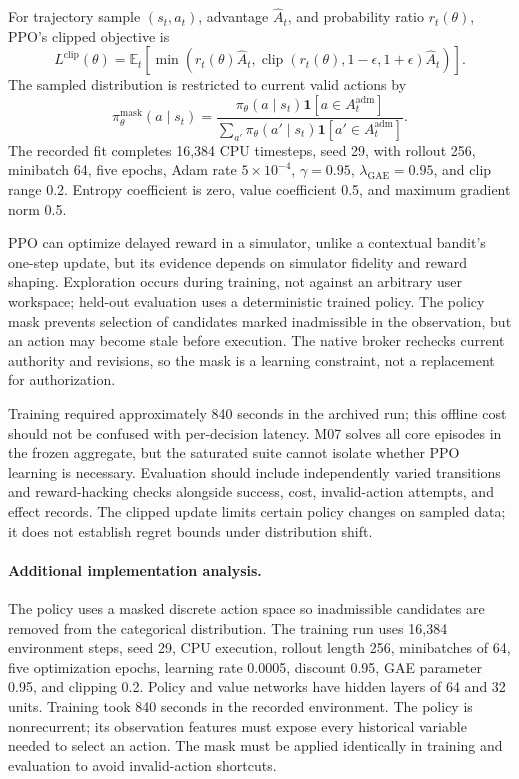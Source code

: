 For trajectory sample $(s_t,a_t)$, advantage $\hat A_t$, and probability ratio $r_t(\theta)$, PPO's clipped objective is
\begin{equation}
L^{\mathrm{clip}}(\theta)=\mathbb E_t\left[\min\left(r_t(\theta)\hat A_t,
\operatorname{clip}(r_t(\theta),1-\epsilon,1+\epsilon)\hat A_t\right)\right].
\end{equation}
The sampled distribution is restricted to current valid actions by
\begin{equation}
\pi_{\theta}^{\mathrm{mask}}(a\mid s_t)=\frac{\pi_\theta(a\mid s_t)\mathbf{1}[a\in A_t^{\mathrm{adm}}]}
{\sum_{a'}\pi_\theta(a'\mid s_t)\mathbf{1}[a'\in A_t^{\mathrm{adm}}]}.
\end{equation}
The recorded fit completes 16,384 CPU timesteps, seed 29, with rollout 256, minibatch 64, five epochs, Adam rate $5\times10^{-4}$, $\gamma=0.95$, $\lambda_{\mathrm{GAE}}=0.95$, and clip range 0.2. Entropy coefficient is zero, value coefficient 0.5, and maximum gradient norm 0.5.

PPO can optimize delayed reward in a simulator, unlike a contextual bandit's one-step update, but its evidence depends on simulator fidelity and reward shaping. Exploration occurs during training, not against an arbitrary user workspace; held-out evaluation uses a deterministic trained policy. The policy mask prevents selection of candidates marked inadmissible in the observation, but an action may become stale before execution. The native broker rechecks current authority and revisions, so the mask is a learning constraint, not a replacement for authorization.

Training required approximately 840 seconds in the archived run; this offline cost should not be confused with per-decision latency. M07 solves all core episodes in the frozen aggregate, but the saturated suite cannot isolate whether PPO learning is necessary. Evaluation should include independently varied transitions and reward-hacking checks alongside success, cost, invalid-action attempts, and effect records. The clipped update limits certain policy changes on sampled data; it does not establish regret bounds under distribution shift.



\paragraph{Additional implementation analysis.} The policy uses a masked discrete action space so inadmissible candidates are removed from the categorical distribution. The training run uses 16,384 environment steps, seed 29, CPU execution, rollout length 256, minibatches of 64, five optimization epochs, learning rate 0.0005, discount 0.95, GAE parameter 0.95, and clipping 0.2. Policy and value networks have hidden layers of 64 and 32 units. Training took 840 seconds in the recorded environment. The policy is nonrecurrent; its observation features must expose every historical variable needed to select an action. The mask must be applied identically in training and evaluation to avoid invalid-action shortcuts.

